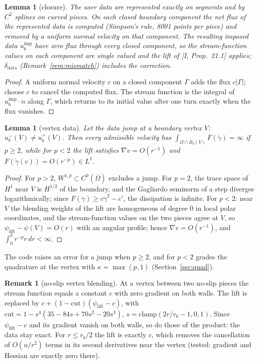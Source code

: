 \documentclass[11pt]{article}
\newtheorem{lemma}[theorem]{Lemma}
\theoremstyle{definition}
\newtheorem{remark}[theorem]{Remark}
\newcommand{\gd}{\dot\gamma}
\begin{document}
\begin{lemma}[closure]\label{lem:closure}
The user data are represented exactly on segments and by $C^2$ splines on curved pieces. On each closed boundary
component the net flux of the represented data is computed (Simpson's rule, 8001 points per piece) and removed by a
uniform normal velocity on that component. The resulting imposed data $u_b^{\mathrm{imp}}$ have zero flux through
every closed component, so the stream-function values on each component are single valued and the lift of
[I, Prop.~21.1] applies; $\delta_{\mathrm{data}}$ (Remark~\ref{rem:mismatch}) includes the correction.
\end{lemma}
\begin{proof}
A uniform normal velocity $c$ on a closed component $\Gamma$ adds the flux $c|\Gamma|$; choose $c$ to cancel the
computed flux. The stream function is the integral of $u_b^{\mathrm{imp}}\cdot n$ along $\Gamma$, which returns to its
initial value after one turn exactly when the flux vanishes.
\end{proof}

\begin{lemma}[vertex data]\label{lem:jump}
Let the data jump at a boundary vertex $V$: $u_b^-(V)\ne u_b^+(V)$. Then every admissible velocity has
$\int_{\Omega\cap B_\delta(V)}F(\gd)=\infty$ if $p\ge2$, while for $p<2$ the lift satisfies $\nabla v=O(r^{-1})$ and
$F(\gd(v))=O(r^{-p})\in L^1$.
\end{lemma}
\begin{proof}
For $p>2$, $W^{1,p}\subset C^0(\overline\Omega)$ excludes a jump. For $p=2$, the trace space of $H^1$ near $V$ is
$H^{1/2}$ of the boundary, and the Gagliardo seminorm of a step diverges logarithmically; since
$F(\gd)\ge c\gd^2-c'$, the dissipation is infinite. For $p<2$: near $V$ the blending weights of the lift are
homogeneous of degree $0$ in local polar coordinates, and the stream-function values on the two pieces agree at
$V$, so $\psi_{\mathrm{lift}}-\psi(V)=O(r)$ with an angular profile; hence $\nabla v=O(r^{-1})$, and
$\int_0^\delta r^{-p}r\,dr<\infty$.
\end{proof}
The code raises an error for a jump when $p\ge2$, and for $p<2$ grades the quadrature at the vertex with
$\kappa=\max(p,1)$ (Section~\ref{sec:quad}).

\begin{remark}[no-slip vertex blending]\label{rem:blend}
At a vertex between two no-slip pieces the stream function equals a constant $c$ with zero gradient on both
walls. The lift is replaced by $c+(1-\mathrm{cut})(\psi_{\mathrm{lift}}-c)$, with
$\mathrm{cut}=1-s^4(35-84s+70s^2-20s^3)$, $s=\mathrm{clamp}(2r/r_b-1,0,1)$. Since $\psi_{\mathrm{lift}}-c$ and its gradient
vanish on both walls, so do those of the product: the data stay exact. For $r\le r_b/2$ the lift is exactly
$c$, which removes the cancellation of $O(u/r^2)$ terms in its second derivatives near the vertex (tested: gradient and
Hessian are exactly zero there).
\end{remark}
\end{document}
